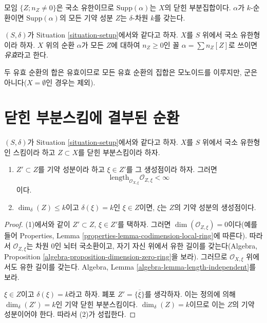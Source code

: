 \noindent
모임 $\{Z; n_Z \not = 0\}$은 국소 유한이므로
$\text{Supp}(\alpha)$는 $X$의 닫힌 부분집합이다. $\alpha$가
$k$-순환이면 $\text{Supp}(\alpha)$의 모든 기약 성분 $Z$는
$\delta$-차원 $k$를 갖는다.

\begin{definition}
\label{definition-effective-cycle}
$(S, \delta)$가 Situation \ref{situation-setup}에서와 같다고 하자.
$X$를 $S$ 위에서 국소 유한형이라 하자. $X$ 위의 순환 $\alpha$가 모든
$Z$에 대하여 $n_Z \geq 0$인 꼴 $\alpha =\sum n_Z [Z]$로 쓰이면
{\it 유효}라고 한다.
\end{definition}

\noindent
두 유효 순환의 합은 유효이므로 모든 유효 순환의 집합은 모노이드를
이루지만, 군은 아니다($X = \emptyset$인 경우는 제외).

\section{닫힌 부분스킴에 결부된 순환}
\label{section-cycle-of-closed-subscheme}

\begin{lemma}
\label{lemma-multiplicity-finite}
$(S, \delta)$가 Situation \ref{situation-setup}에서와 같다고 하자.
$X$를 $S$ 위에서 국소 유한형인 스킴이라 하고 $Z \subset X$를 닫힌
부분스킴이라 하자.
\begin{enumerate}
\item $Z' \subset Z$를 기약 성분이라 하고 $\xi \in Z'$를 그 생성점이라
하자. 그러면
$$
\text{length}_{\mathcal{O}_{X, \xi}} \mathcal{O}_{Z, \xi} < \infty
$$
이다.
\item $\dim_\delta(Z) \leq k$이고 $\delta(\xi) = k$인 $\xi \in Z$이면,
$\xi$는 $Z$의 기약 성분의 생성점이다.
\end{enumerate}
\end{lemma}

\begin{proof}
(1)에서와 같이 $Z' \subset Z$, $\xi \in Z'$를 택하자.
그러면 $\dim(\mathcal{O}_{Z, \xi}) = 0$이다(예를 들어 Properties, Lemma
\ref{properties-lemma-codimension-local-ring}에 따른다). 따라서
$\mathcal{O}_{Z, \xi}$는 차원 0인 뇌터 국소환이고, 자기 자신 위에서
유한 길이를 갖는다(Algebra, Proposition
\ref{algebra-proposition-dimension-zero-ring}을 보라). 그러므로
$\mathcal{O}_{X, \xi}$ 위에서도 유한 길이를 갖는다. Algebra, Lemma
\ref{algebra-lemma-length-independent}를 보라.

\medskip\noindent
$\xi \in Z$이고 $\delta(\xi) = k$라고 하자. 폐포
$Z' = \overline{\{\xi\}}$를 생각하자. 이는 정의에 의해
$\dim_\delta(Z') = k$인 기약 닫힌 부분스킴이다. $\dim_\delta(Z) = k$이므로
이는 $Z$의 기약 성분이어야 한다. 따라서 (2)가 성립한다.
\end{proof}

